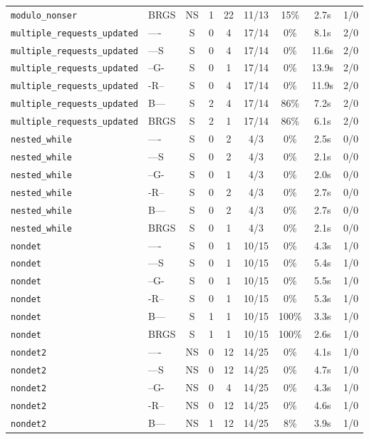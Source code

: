 \begin{tabular}{llccccccc}
\texttt{modulo_nonser} & BRGS & NS & 1 & 22 & 11/13 & 15\% & 2.7s & 1/0 \\
\texttt{multiple_requests_updated} & ---- & S & 0 & 4 & 17/14 & 0\% & 8.1s & 2/0 \\
\texttt{multiple_requests_updated} & ---S & S & 0 & 4 & 17/14 & 0\% & 11.6s & 2/0 \\
\texttt{multiple_requests_updated} & --G- & S & 0 & 1 & 17/14 & 0\% & 13.9s & 2/0 \\
\texttt{multiple_requests_updated} & -R-- & S & 0 & 4 & 17/14 & 0\% & 11.9s & 2/0 \\
\texttt{multiple_requests_updated} & B--- & S & 2 & 4 & 17/14 & 86\% & 7.2s & 2/0 \\
\texttt{multiple_requests_updated} & BRGS & S & 2 & 1 & 17/14 & 86\% & 6.1s & 2/0 \\
\texttt{nested_while} & ---- & S & 0 & 2 & 4/3 & 0\% & 2.5s & 0/0 \\
\texttt{nested_while} & ---S & S & 0 & 2 & 4/3 & 0\% & 2.1s & 0/0 \\
\texttt{nested_while} & --G- & S & 0 & 1 & 4/3 & 0\% & 2.0s & 0/0 \\
\texttt{nested_while} & -R-- & S & 0 & 2 & 4/3 & 0\% & 2.7s & 0/0 \\
\texttt{nested_while} & B--- & S & 0 & 2 & 4/3 & 0\% & 2.7s & 0/0 \\
\texttt{nested_while} & BRGS & S & 0 & 1 & 4/3 & 0\% & 2.1s & 0/0 \\
\texttt{nondet} & ---- & S & 0 & 1 & 10/15 & 0\% & 4.3s & 1/0 \\
\texttt{nondet} & ---S & S & 0 & 1 & 10/15 & 0\% & 5.4s & 1/0 \\
\texttt{nondet} & --G- & S & 0 & 1 & 10/15 & 0\% & 5.5s & 1/0 \\
\texttt{nondet} & -R-- & S & 0 & 1 & 10/15 & 0\% & 5.3s & 1/0 \\
\texttt{nondet} & B--- & S & 1 & 1 & 10/15 & 100\% & 3.3s & 1/0 \\
\texttt{nondet} & BRGS & S & 1 & 1 & 10/15 & 100\% & 2.6s & 1/0 \\
\texttt{nondet2} & ---- & NS & 0 & 12 & 14/25 & 0\% & 4.1s & 1/0 \\
\texttt{nondet2} & ---S & NS & 0 & 12 & 14/25 & 0\% & 4.7s & 1/0 \\
\texttt{nondet2} & --G- & NS & 0 & 4 & 14/25 & 0\% & 4.3s & 1/0 \\
\texttt{nondet2} & -R-- & NS & 0 & 12 & 14/25 & 0\% & 4.6s & 1/0 \\
\texttt{nondet2} & B--- & NS & 1 & 12 & 14/25 & 8\% & 3.9s & 1/0 \\

\end{tabular}
